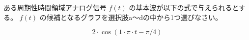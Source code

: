 ある周期性時間領域アナログ信号 $f(t)$ の基本波が以下の式で与えられるとする。
$f(t)$ の候補となるグラフを選択肢a〜dの中から1つ選びなさい。

\[
2 \cdot \cos( 1 \cdot \pi \cdot t - \pi/4 )
\]
